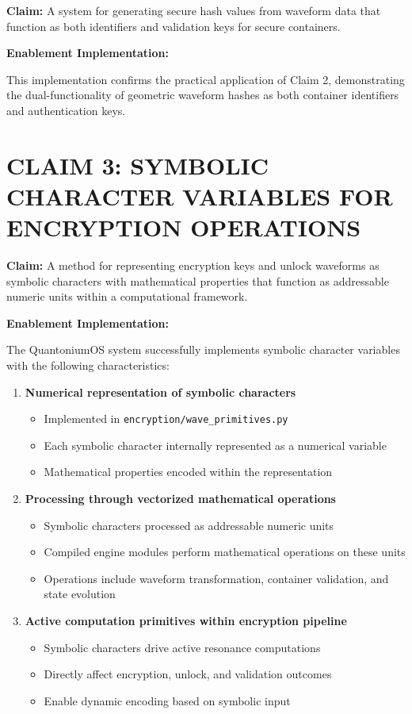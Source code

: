 \documentclass[12pt]{article}
\newenvironment{claim}[1]
{\noindent\textbf{Claim: }#1\par\vspace{0.5em}\noindent\textbf{Enablement Implementation:}\par\vspace{0.5em}}
{}
\begin{document}
\begin{claim}{A system for generating secure hash values from waveform data that function as both identifiers and validation keys for secure containers.}
This implementation confirms the practical application of Claim 2, demonstrating the dual-functionality of geometric waveform hashes as both container identifiers and authentication keys.
\end{claim}

\section{CLAIM 3: SYMBOLIC CHARACTER VARIABLES FOR ENCRYPTION OPERATIONS}
\label{sec:claim3}

\begin{claim}{A method for representing encryption keys and unlock waveforms as symbolic characters with mathematical properties that function as addressable numeric units within a computational framework.}

The QuantoniumOS system successfully implements symbolic character variables with the following characteristics:

\begin{enumerate}
\item \textbf{Numerical representation of symbolic characters}
   \begin{itemize}
   \item Implemented in \texttt{encryption/wave\_primitives.py}
   \item Each symbolic character internally represented as a numerical variable
   \item Mathematical properties encoded within the representation
   \end{itemize}

\item \textbf{Processing through vectorized mathematical operations}
   \begin{itemize}
   \item Symbolic characters processed as addressable numeric units
   \item Compiled engine modules perform mathematical operations on these units
   \item Operations include waveform transformation, container validation, and state evolution
   \end{itemize}

\item \textbf{Active computation primitives within encryption pipeline}
   \begin{itemize}
   \item Symbolic characters drive active resonance computations
   \item Directly affect encryption, unlock, and validation outcomes
   \item Enable dynamic encoding based on symbolic input
   \end{itemize}


\end{enumerate}
\end{claim}
\end{document}
